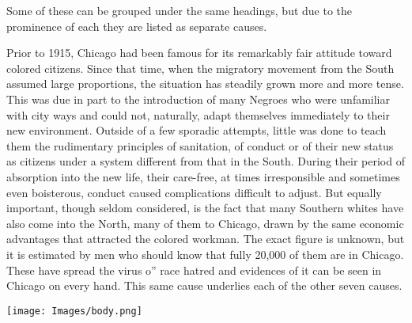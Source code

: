 \documentclass[11pt,article,oneside]{memoir}
\makeatletter
\def\maxwidth{\ifdim\Gin@nat@width>\linewidth\linewidth
\else\Gin@nat@width\fi}
\let\Oldincludegraphics\includegraphics
\renewcommand{\includegraphics}[1]{\Oldincludegraphics[width=\maxwidth]{#1}}
\makeatother
\begin{document}
Some of these can be grouped under the same headings, but due to the
prominence of each they are listed as separate causes.

Prior to 1915, Chicago had been famous for its remarkably fair attitude
toward colored citizens. Since that time, when the migratory movement
from the South assumed large proportions, the situation has steadily
grown more and more tense. This was due in part to the introduction of
many Negroes who were unfamiliar with city ways and could not,
naturally, adapt themselves immediately to their new environment.
Outside of a few sporadic attempts, little was done to teach them the
rudimentary principles of sanitation, of conduct or of their new status
as citizens under a system different from that in the South. During
their period of absorption into the new life, their care-free, at times
irresponsible and sometimes even boisterous, conduct caused
complications difficult to adjust. But equally important, though seldom
considered, is the fact that many Southern whites have also come into
the North, many of them to Chicago, drawn by the same economic
advantages that attracted the colored workman. The exact figure is
unknown, but it is estimated by men who should know that fully 20,000 of
them are in Chicago. These have spread the virus o'' race hatred and
evidences of it can be seen in Chicago on every hand. This same cause
underlies each of the other seven causes.

\texttt{[image: Images/body.png]}
\end{document}
